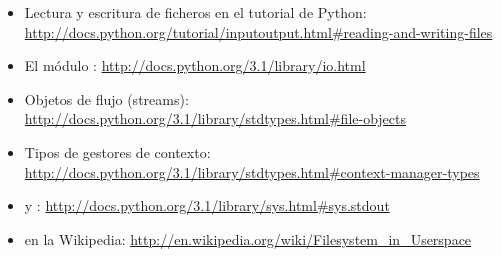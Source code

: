 \begin{itemize}

\item Lectura y escritura de ficheros en el tutorial de Python: \newline
\href{http://docs.python.org/tutorial/inputoutput.html\#reading-and-writing-files}{http://docs.python.org/tutorial/inputoutput.html\#reading-and-writing-files}

\item El módulo : \newline \href{http://docs.python.org/3.1/library/io.html}{http://docs.python.org/3.1/library/io.html}

\item Objetos de flujo (streams): \newline \href{http://docs.python.org/3.1/library/stdtypes.html\#file-objects}{http://docs.python.org/3.1/library/stdtypes.html\#file-objects}

\item Tipos de gestores de contexto: \newline \href{http://docs.python.org/3.1/library/stdtypes.html\#context-manager-types}{http://docs.python.org/3.1/library/stdtypes.html\#context-manager-types} 

\item {} y : \newline \href{http://docs.python.org/3.1/library/sys.html\#sys.stdout}{http://docs.python.org/3.1/library/sys.html\#sys.stdout}

\item {} en la Wikipedia: \newline \href{http://en.wikipedia.org/wiki/Filesystem\_in\_Userspace}{http://en.wikipedia.org/wiki/Filesystem\_in\_Userspace}

\end{itemize}
